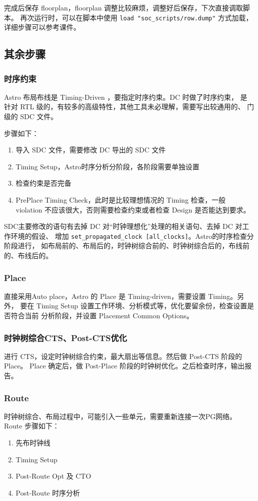 \documentclass[12pt,hyperref,a4paper,UTF8]{ctexart}
\begin{document}
完成后保存 floorplan，floorplan 调整比较麻烦，调整好后保存，下次直接调取脚本。
再次运行时，可以在脚本中使用 \texttt{load "soc\_scripts/row.dump"} 方式加载，
详细步骤可以参考课件。

\subsection{其余步骤}
\subsubsection{时序约束}
Astro 布局布线是 Timing-Driven ，要指定时序约束。DC 时做了时序约束，
是针对 RTL 级的，有较多的高级特性，其他工具未必理解，需要写出较通用的、
门级的 SDC 文件。 

步骤如下：
\begin{enumerate}
    \item 导入 SDC 文件，需要修改 DC 导出的 SDC 文件
    \item Timing Setup，Astro时序分析分阶段，各阶段需要单独设置
    \item 检查约束是否完备
    \item PrePlace Timing Check，此时是比较理想情况的 Timing 检查，一般
    violation 不应该很大，否则需要检查约束或者检查 Design 是否能达到要求。
\end{enumerate}

SDC主要修改的语句有去掉 DC 对“时钟理想化”处理的相关语句、去掉 DC 对工作环境的假设、
增加 \texttt{set\_propagated\_clock [all\_clocks]}。Astro的时序检查分阶段进行，
如布局前的、布局后的，时钟树综合前的、时钟树综合后的，布线前的、布线后的。

\subsubsection{Place}
直接采用Auto place，Astro 的 Place 是 Timing-driven，需要设置 Timing。另外，
要在 Timing Setup 设置工作环境、分析模式等，优化要留余份，检查设置是否符合当前
分析阶段，并设置 Placement Common Options。

\subsubsection{时钟树综合CTS、Post-CTS优化}
进行 CTS，设定时钟树综合约束，最大扇出等信息。然后做 Post-CTS 阶段的 Place。
Place 确定后，做 Post-Place 阶段的时钟树优化。之后检查时序，输出报告。

\subsubsection{Route}
时钟树综合、布局过程中，可能引入一些单元，需要重新连接一次PG网络。
Route 步骤如下：
\begin{enumerate}
    \item 先布时钟线
    \item Timing Setup
    \item Post-Route Opt 及 CTO
    \item Post-Route 时序分析
\end{enumerate}
\end{document}
